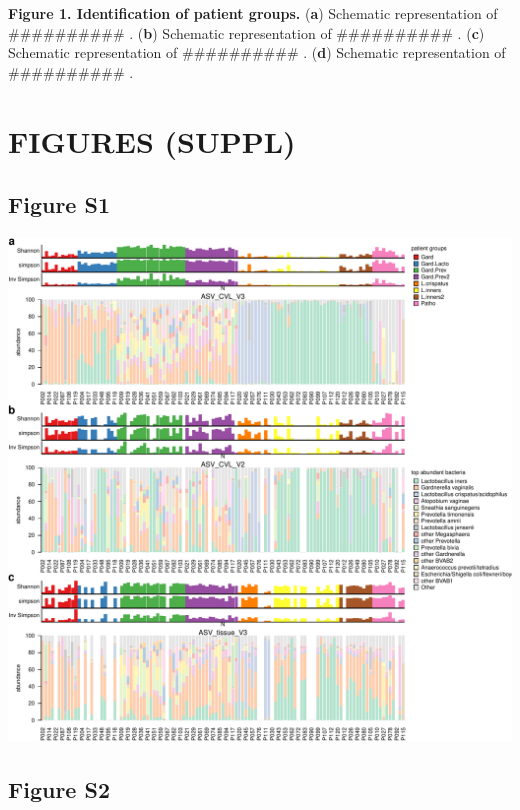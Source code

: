 \documentclass[
]{article}
\begin{document}
\textbf{Figure 1. Identification of patient groups.}
(\textbf{a}) Schematic representation of \#\#\#\#\#\#\#\#\#\# .
(\textbf{b}) Schematic representation of \#\#\#\#\#\#\#\#\#\# .
(\textbf{c}) Schematic representation of \#\#\#\#\#\#\#\#\#\# .
(\textbf{d}) Schematic representation of \#\#\#\#\#\#\#\#\#\# .

\clearpage

\hypertarget{figures-suppl}{%
\section{FIGURES (SUPPL)}\label{figures-suppl}}

\hypertarget{figure-s1}{%
\subsection{Figure S1}\label{figure-s1}}

\includegraphics[width=1\linewidth]{manuscript_template_files/figure-latex/unnamed-chunk-8-1}

\clearpage

\hypertarget{figure-s2}{%
\subsection{Figure S2}\label{figure-s2}}
\end{document}
